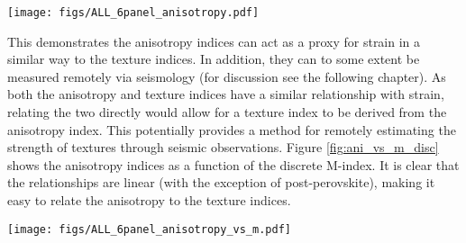 \documentclass[a4paper,12pt,twoside]{report}
\numberwithin{equation}{chapter}
\begin{document}
\begin{figure*}[p]
  \centering
    \texttt{[image: figs/ALL\_6panel\_anisotropy.pdf]}
  \caption[Anisotropy measures and strain]{Seismic anisotropy measures, the Universal Elastic Anisotropy Index (uA) and the \cite{Ledbetter2006} index (lmA) against strain. \textbf{Top row} shows data from olivine VPSC models, \textbf{middle row} shows quartz, and \textbf{bottom row} shows post-perovskite. \textbf{Right column} shows data from axial compression models and \textbf{left column} shows data from simple shear models. All calculations use $n$ = 10,000 grains.} 
  \label{fig:ani_vs_strain}
\end{figure*} 

This demonstrates the anisotropy indices can act as a proxy for strain in a similar way to the texture indices. In addition, they can to some extent be measured remotely via seismology (for discussion see the following chapter). As both the anisotropy and texture indices have a similar relationship with strain, relating the two directly would allow for a texture index to be derived from the anisotropy index. This potentially provides a method for remotely estimating the strength of textures through seismic observations. Figure \ref{fig:ani_vs_m_disc} shows the anisotropy indices as a function of the discrete M-index. It is clear that the relationships are linear (with the exception of post-perovskite), making it easy to relate the anisotropy to the texture indices. 

\begin{figure*}[p]
  \centering
    \texttt{[image: figs/ALL\_6panel\_anisotropy\_vs\_m.pdf]}
  \caption[Relationship of anisotropy indices and M-index (disc)]{Seismic anisotropy measures, the Universal Elastic Anisotropy Index (uA) and the \cite{Ledbetter2006} index (lmA) as a function of the discrete M-index. \textbf{Top row} shows data from olivine VPSC models, \textbf{middle row} shows quartz, and \textbf{bottom row} shows post-perovskite. \textbf{Right column} shows data from axial compression models and \textbf{left column} shows data from simple shear models. All calculations use $n$ = 10,000 grains.} 
  \label{fig:ani_vs_m_disc}
\end{figure*} 
 
\end{document}
